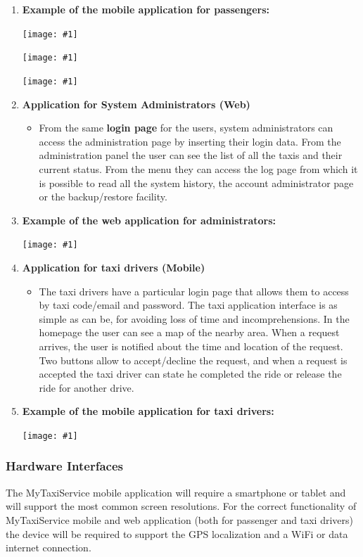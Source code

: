 \documentclass[11pt, a4paper,titlepage]{article}
\newcommand{\productname}{MyTaxiService }
\newcommand{\image}[1]{
	\begin{center}
		\noindent \texttt{[image: \#1]}
	\end{center}
	}
\begin{document}
\begin{enumerate}
\begin{itemize}
\begin{description}
		\end{description}
	\end{itemize}
	\pagebreak
	\item \textbf{Example of the mobile application for passengers: } \newline
	\image{gui_passenger_login.png}
	\image{gui_passenger_home.png}
	\image{gui_passenger_confirmation.png}
	\item \textbf{Application for System Administrators (Web)}
		\begin{itemize}
			\item From the same \textbf{login page} for the users, system administrators can access the administration page by inserting their login data. \newline
			From the administration panel the user can see the list of all the taxis and their current status.
			From the menu they can access the log page from which it is possible to read all the system history, the account administrator page or the backup/restore facility.
		\end{itemize}
		\pagebreak
		\item \textbf{Example of the web application for administrators: } \newline
		\image{gui_admin.png}
	
	\item \textbf{Application for taxi drivers (Mobile)}
		\begin{itemize}
			\item The taxi drivers have a particular login page that allows them to access by taxi code/email and password. \newline The taxi application interface is as simple as can be, for avoiding loss of time and incomprehensions.
			In the homepage the user can see a map of the nearby area. When a request arrives, the user is notified about the time and location of the request. Two buttons allow to accept/decline the request, and when a request is accepted the taxi driver can state he completed the ride or release the ride for another drive.
		\end{itemize}
		\item \textbf{Example of the mobile application for taxi drivers: } \newline
		\image{gui_driver.png}
	
\end{enumerate}

\subsubsection{Hardware Interfaces}
The \productname mobile application will require a smartphone or tablet and will support the most common screen resolutions. \newline
For the correct functionality of \productname mobile and web application (both for passenger and taxi drivers) the device will be required to support the GPS localization and a WiFi or data internet connection. 
\end{document}
